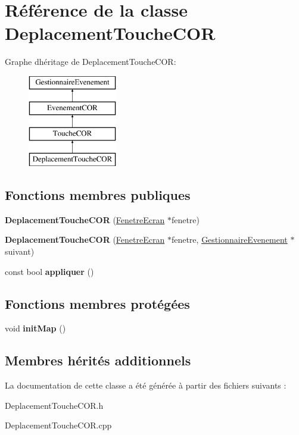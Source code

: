 \hypertarget{class_deplacement_touche_c_o_r}{}\section{Référence de la classe Deplacement\+Touche\+C\+OR}
\label{class_deplacement_touche_c_o_r}
Graphe d\textquotesingle{}héritage de Deplacement\+Touche\+C\+OR\+:\begin{figure}[H]
\begin{center}
\leavevmode
\includegraphics[height=4.000000cm]{class_deplacement_touche_c_o_r}
\end{center}
\end{figure}
\subsection*{Fonctions membres publiques}
\begin{DoxyCompactItemize}
\item 
\mbox{\label{class_deplacement_touche_c_o_r_a8c54d6d19173c53901a385ae85c7314e}} 
{\bfseries Deplacement\+Touche\+C\+OR} (\mbox{\hyperlink{class_fenetre_ecran}{Fenetre\+Ecran}} $\ast$fenetre)
\item 
\mbox{\label{class_deplacement_touche_c_o_r_a2664d56cc38a4827a3ffa328103dd598}} 
{\bfseries Deplacement\+Touche\+C\+OR} (\mbox{\hyperlink{class_fenetre_ecran}{Fenetre\+Ecran}} $\ast$fenetre, \mbox{\hyperlink{class_gestionnaire_evenement}{Gestionnaire\+Evenement}} $\ast$suivant)
\item 
\mbox{\label{class_deplacement_touche_c_o_r_a1942889cdb9c0de04cb026740d44d8cd}} 
const bool {\bfseries appliquer} ()
\end{DoxyCompactItemize}
\subsection*{Fonctions membres protégées}
\begin{DoxyCompactItemize}
\item 
\mbox{\label{class_deplacement_touche_c_o_r_a6b41e878f5390ee9dc0829a85486dd62}} 
void {\bfseries init\+Map} ()
\end{DoxyCompactItemize}
\subsection*{Membres hérités additionnels}


La documentation de cette classe a été générée à partir des fichiers suivants \+:\begin{DoxyCompactItemize}
\item 
Deplacement\+Touche\+C\+O\+R.\+h\item 
Deplacement\+Touche\+C\+O\+R.\+cpp\end{DoxyCompactItemize}
